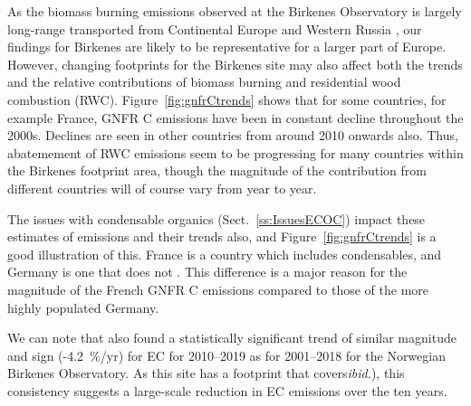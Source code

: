 As the biomass burning emissions observed at the
Birkenes Observatory is largely long-range transported from Continental
Europe and Western Russia \citep{Yttri2021}, our findings for Birkenes
are likely to be representative for a larger part of Europe. However,
changing footprints  for the Birkenes site may also affect both the trends and
the relative contributions of biomass burning and residential wood combustion (RWC).
Figure~\ref{fig:gnfrCtrends} shows that for some countries, for example France, GNFR C \pmfine emissions have been in constant decline throughout the 2000s. Declines are seen in other countries from around 2010 onwards also. Thus, abatemement of RWC emissions seem to be progressing for many countries within the Birkenes footprint area, though the magnitude of the contribution from different countries will of course vary from year to year.

The issues with condensable organics (Sect.~\ref{ss:IssuesECOC}) impact these estimates of \pmfine emissions and their trends also, and Figure~\ref{fig:gnfrCtrends} is a good illustration of this. France is a country which includes condensables, and Germany is one that does not \citep{CONDws2020}. This difference is a major reason for the magnitude of the French GNFR C emissions compared to those of the more highly populated Germany. 




We can note that \citet{Yttri2021} also found a statistically significant trend of similar magnitude and sign
(-4.2~\%/yr)  for EC for 2010--2019 as for 2001--2018
for the Norwegian Birkenes Observatory. As this site has a footprint that covers{\it ibid.}), this consistency suggests a large-scale reduction in EC emissions over the ten years.


